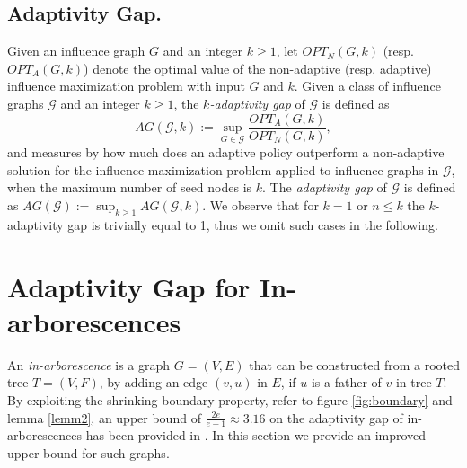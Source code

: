 \subsection*{Adaptivity Gap.} \label{ag}

Given an influence graph $G$ and an integer $k\geq 1$, let $OPT_N(G,k)$ (resp. $OPT_A(G,k)$) denote the optimal value of the non-adaptive (resp. adaptive) influence maximization problem with input $G$ and $k$. Given a class of influence graphs $\mathcal{G}$ and an integer $k\geq 1$, the {\em $k$-adaptivity gap} of $\mathcal G$ is defined as $$AG(\mathcal{G},k):=\sup_{G\in\mathcal{G}}\frac{OPT_A(G,k)}{OPT_N(G,k)},$$ and measures by how much does an adaptive policy outperform a non-adaptive solution for the influence maximization problem applied to influence graphs in $\mathcal{G}$, when the maximum number of seed nodes is $k$. The {\em adaptivity gap} of $\mathcal{G}$ is defined as $AG(\mathcal{G}):=\sup_{k\geq 1}AG(\mathcal{G},k)$. We observe that for $k=1$ or $n\leq k$ the $k$-adaptivity gap is trivially equal to 1, thus we omit such cases in the following. 

\section{Adaptivity Gap for In-arborescences}
\label{sec_inarb}
An {\em in-arborescence} is a graph $G=(V,E)$ that can be constructed from a rooted tree $T=(V,F)$, by adding an edge $(v,u)$ in $E$, if $u$ is a father of $v$ in tree $T$. By exploiting the shrinking boundary property, refer to figure \ref{fig:boundary} and lemma \ref{lemm2}, an upper bound of $\frac{2e}{e-1}\approx 3.16$ on the adaptivity gap of in-arborescences has been provided in \cite{Chen2019}. In this section we provide an improved upper bound for such graphs. 

